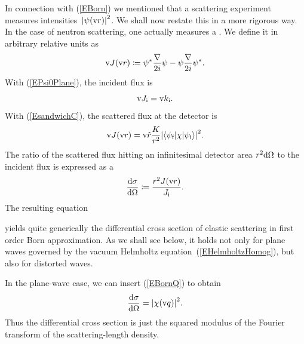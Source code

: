 In connection with (\ref{EBorn}) we mentioned
that a scattering experiment measures intensities~${|\psi(\text{v}{r})|}^2$.
We shall now restate this in a more rigorous way.
In the case of neutron scattering,
one actually measures a .
We define it in arbitrary relative units as
\begin{equation}\label{EdefJ}
  \text{v}{J}(\text{v}{r}) \coloneqq  \psi^*\frac{\mathbf{\nabla}}{2i}\psi - \psi\frac{\mathbf{\nabla}}{2i}\psi^*.
\end{equation}
%
With (\ref{EPsi0Plane}), the incident flux is
\begin{equation}
  \text{v}{J}_{\text{i}} = \text{v}{k}_{\text{i}}.
\end{equation}
With (\ref{EsandwichC}), the scattered flux at the detector is
\begin{equation}\label{EJr}
  \text{v}{J}(\text{v}{r})
  = \text{v}{\hat r}\frac{K}{r^2}
    {\left|\left\langle\psi_{\text{f}}|\chi|\psi_{\text{i}}\right\rangle\right|}^2.
\end{equation}
The ratio of the scattered flux hitting an infinitesimal detector area
$r^2\text{d}\Omega$ to the incident flux is expressed as a
%
\begin{equation}
  \frac{\text{d}\sigma}{\text{d}\Omega}
  \coloneqq  \frac{r^2 J(\text{v}{r})}{J_{\text{i}}}.
\end{equation}
%
%
The resulting equation

yields quite generically the differential cross section of elastic scattering
in first order Born approximation.
As we shall see below,
it holds not only for plane waves governed
by the vacuum Helmholtz equation~(\ref{EHelmholtzHomog}),
but also for distorted waves.

In the plane-wave case, we can insert (\ref{EBornQ}) to obtain
\begin{equation}\label{Ecross1}
  \frac{\text{d}\sigma}{\text{d}\Omega}
  = {\left| \chi(\text{v}{q}) \right|}^2.
\end{equation}
Thus the differential cross section is just the squared modulus
of the Fourier transform 
%
of the scattering-length density.


